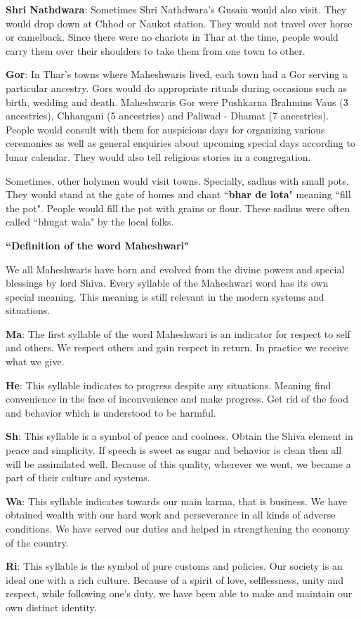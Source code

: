\textbf{Shri Nathdwara}: Sometimes Shri Nathdwara's Gusain would also visit.
They would drop down at Chhod or Naukot station. They would not travel over
horse or camelback. Since there were no chariots in Thar at the time, people
would carry them over their shoulders to take them from one town to other.

\textbf{Gor}: In Thar's towns where Maheshwaris lived, each town had a Gor
serving a particular ancestry. Gors would do appropriate rituals during
occasions such as birth, wedding and death. Maheshwaris Gor were Pushkarna
Brahmins Vaus (3 ancestries), Chhangani (5 ancestries) and Paliwad - Dhamat (7
ancestries). People would consult with them for auspicious days for organizing
various ceremonies as well as general enquiries about upcoming special days
according to lunar calendar. They would also tell religious stories in a
congregation.

Sometimes, other holymen would visit towns. Specially, sadhus with small pots.
They would stand at the gate of homes and chant ``\textbf{bhar de lota}"
meaning ``fill the pot". People would fill the pot with grains or flour. These
sadhus were often called ``bhugat wala" by the local folks.

\begin{framed}
\begin{center}\textbf{``Definition of the word
Maheshwari"}\end{center}

We all Maheshwaris have born and evolved from the divine powers and special
blessings by lord Shiva. Every syllable of the Maheshwari word has its own
special meaning. This meaning is still relevant in the modern systems and
situations.

\textbf{Ma}: The first syllable of the word Maheshwari is an indicator for
respect to self and others. We respect others and gain respect in return. In
practice we receive what we give.

\textbf{He}: This syllable indicates to progress despite any situations.
Meaning find convenience in the face of inconvenience and make progress. Get
rid of the food and behavior which is understood to be harmful.

\textbf{Sh}: This syllable is a symbol of peace and coolness. Obtain the Shiva
element in peace and simplicity. If speech is sweet as sugar and behavior is
clean then all will be assimilated well. Because of this quality, wherever we
went, we became a part of their culture and systems.

\textbf{Wa}: This syllable indicates towards our main karma, that is business.
We have obtained wealth with our hard work and perseverance in all kinds of
adverse conditions. We have served our duties and helped in strengthening the
economy of the country.

\textbf{Ri}: This syllable is the symbol of pure customs and policies. Our
society is an ideal one with a rich culture. Because of a spirit of love,
selflessness, unity and respect, while following one's duty, we have been able
to make and maintain our own distinct identity.

\end{framed}
